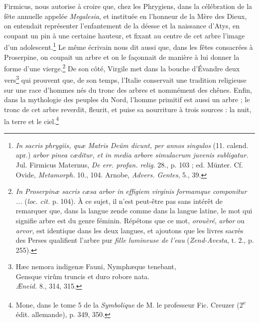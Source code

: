 \documentclass{article}
\begin{document}
Firmicus, nous autorise à croire que, chez les Phrygiens, dans la célébration de la fête annuelle appelée \emph{Megalesia}, et instituée en l'honneur de la Mère des Dieux, on entendait représenter l'enfantement de la déesse et la naissance d'Atys, en coupant un pin à une certaine hauteur, et fixant au centre de cet arbre l'image d'un adolescent.\footnote{\emph{In sacris phrygiis, quæ Matris Deûm dicunt, per annos singulos} (11. calend. apr.) \emph{arbor pinea cæditur, et in media arbore simulacrum juvenis subligatur.} Jul. Firmicus Maternus, \emph{De err. profan. relig.} 28., p. 103 ; ed. Münter. Cf. Ovide, \emph{Metamorph.} 10., 104. Arnobe, \emph{Advers. Gentes}, 5., 39.} Le même écrivain nous dit aussi que, dans les fêtes consacrées à Proserpine, on coupait un arbre et on le façonnait de manière à lui donner la forme d'une vierge.\footnote{\emph{In Proserpinæ sacris cæsa arbor in effigiem virginis formamque componitur ...} (\emph{loc. cit.} p. 104). À ce sujet, il n'est peut-être pas sans intérêt de remarquer que, dans la langue zende comme dans la langue latine, le mot qui signifie arbre est du genre féminin. Répétons que ce mot, \emph{orouèré}, \emph{arbor} ou \emph{arvor}, est identique dans les deux langues, et ajoutons que les livres sacrés des Perses qualifient l'arbre pur \emph{fille lumineuse de l'eau} (\emph{Zend-Avesta}, t. 2., p. 255).} De son côté, Virgile met dans la bouche d'Évandre deux vers\footnote{Hæc nemora indigenæ Fauni, Nymphæque tenebant,\\\hspace*{5mm}Gensque virûm truncis et duro robore nata.\\\hspace*{15mm}\emph{Æneid.} 8., 314, 315.} qui prouvent que, de son temps, l'Italie conservait une tradition religieuse sur une race d'hommes nés du tronc des arbres et nommément des chênes. Enfin, dans la mythologie des peuples du Nord, l'homme primitif est aussi un arbre ; le tronc de cet arbre reverdit, fleurit, et puise sa nourriture à trois sources : la nuit, la terre et le ciel.\footnote{Mone, dans le tome 5 de la \emph{Symbolique} de M. le professeur Fic. Creuzer (2\textsuperscript{e} édit. allemande), p. 349, 350.}
\end{document}
